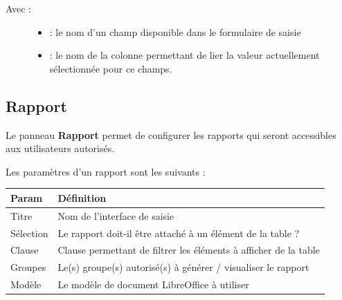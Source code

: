 \documentclass[letterpaper,10pt,french]{sphinxmanual}
\begin{document}
\code{{[}\{"XX":\{"tfield":"YY","init":"true","display": "always","operator":"=","options":{[}{]}\}\}{]}}
\begin{description}
\item[{Avec :}] \leavevmode\begin{itemize}
\item {} 
 : le nom d'un champ disponible dans le formulaire de saisie

\item {} 
 : le nom de la colonne permettant de lier la valeur
actuellement sélectionnée pour ce champs.

\end{itemize}

\end{description}


\subsection{Rapport}
\label{tables/infopanel:rapport}
Le panneau \textbf{Rapport} permet de configurer les rapports qui seront
accessibles aux utilisateurs autorisés.


Les paramètres d'un rapport sont les suivants :

\begin{tabulary}{\linewidth}{|L|L|}
\hline

\textbf{Param}
 & 
\textbf{Définition}
\\
\hline
Titre
 & 
Nom de l'interface de saisie
\\
\hline
Sélection
 & 
Le rapport doit-il être attaché à un élément de la table ?
\\
\hline
Clause
 & 
Clause permettant de filtrer les éléments à afficher de la table
\\
\hline
Groupes
 & 
Le(s) groupe(s) autorisé(s) à générer / visualiser le rapport
\\
\hline
Modèle
 & 
Le modèle de document LibreOffice à utiliser
\\
\hline\end{tabulary}
\end{document}
